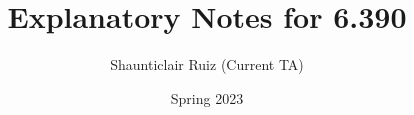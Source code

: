 \documentclass[10pt,oneside]{book}
\title{Explanatory Notes for 6.390}
\author{Shaunticlair Ruiz (Current TA)}
\date{Spring 2023}
\begin{document}
\maketitle

\setcounter{tocdepth}{1} %
\tableofcontents

 
 
 
 


 
 
 


 
 
 




 

\begin{appendices}
    
\end{appendices} 





%
%
%


%






%
%




% 
% 
%






% 
% 
\end{document}
